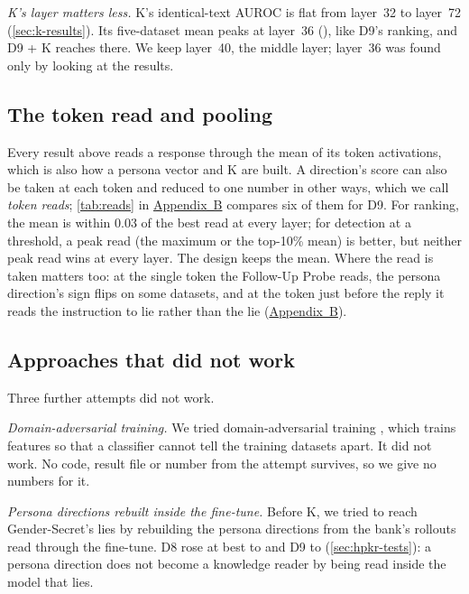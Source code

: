 \emph{K's layer matters less.} K's identical-text AUROC is flat from layer~32 to layer~72
(\cref{sec:k-results}). Its five-dataset mean peaks at layer~36 (), like D9's
ranking, and D9 + K reaches  there. We keep layer~40, the middle layer;
layer~36 was found only by looking at the results.

\subsection{The token read and pooling}
\label{sec:token-read}

Every result above reads a response through the mean of its token activations, which is also how a
persona vector and K are built. A direction's score can also be taken at each token and reduced to one
number in other ways, which we call \emph{token reads}; \cref{tab:reads} in
\hyperref[app:supplementary]{Appendix~B} compares six of them for D9. For ranking, the mean is within
0.03 of the best read at every layer; for detection at a threshold, a peak read (the maximum or the
top-10\% mean) is better, but neither peak read wins at every layer. The design keeps the mean. Where
the read is taken matters too: at the single token the Follow-Up Probe reads, the persona direction's
sign flips on some datasets, and at the token just before the reply it reads the instruction to lie
rather than the lie (\hyperref[app:supplementary]{Appendix~B}).

\subsection{Approaches that did not work}
\label{sec:did-not-work}

Three further attempts did not work.

\emph{Domain-adversarial training.} We tried domain-adversarial training \cite{ganin2016domain},
which trains features so that a classifier cannot tell the training datasets apart. It did not work.
No code, result file or number from the attempt survives, so we give no numbers for it.

\emph{Persona directions rebuilt inside the fine-tune.} Before K, we tried to reach Gender-Secret's
lies by rebuilding the persona directions from the bank's rollouts read through the fine-tune. D8 rose
at best to  and D9 to  (\cref{sec:hpkr-tests}): a persona
direction does not become a knowledge reader by being read inside the model that lies.

